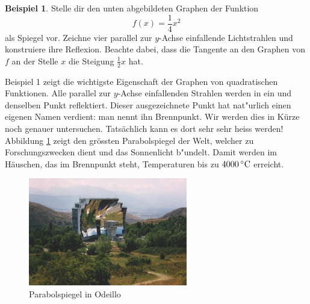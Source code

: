 \documentclass[%
<<<<<<< Updated upstream
11pt,%
twoside,%
titlepage,%
german,%
=======
11pt,%
twoside,%
titlepage,%
swissgerman,%
>>>>>>> Stashed changes
headsepline%
]{scrartcl}
\newcommand{\definition}[1]{\colorbox{emerald}{#1}}
\theoremstyle{definition}
\newtheorem{bsp}{Beispiel}[subsection] %
\theoremstyle{plain}
\newcounter{theo}[section]\setcounter{theo}{0}
\newcommand{\definition}[1]{\colorbox{emerald}{#1}}
\begin{document}
\begin{bsp}
Stelle dir den unten abgebildeten Graphen der Funktion
$$f(x) = \frac{1}{4}x^2$$
als Spiegel vor. Zeichne vier parallel zur $y$-Achse einfallende Lichtstrahlen und konstruiere ihre Reflexion. Beachte dabei, dass die Tangente an den Graphen von $f$ an der Stelle $x$ die Steigung $\frac{1}{2}x$ hat.
\begin{figure}
\begin{center}
\end{center}
\end{figure}
\end{bsp}
Beispiel 1 zeigt die wichtigste Eigenschaft der Graphen von quadratischen Funktionen. Alle parallel zur $y$-Achse einfallenden Strahlen werden in ein und denselben Punkt reflektiert. Dieser ausgezeichnete Punkt hat nat"urlich einen eigenen Namen verdient: man nennt ihn
\definition{Brennpunkt}. Wir werden dies in K\"urze noch genauer untersuchen.
Tats\"achlich kann es dort sehr sehr heiss werden! Abbildung \ref{odiello} zeigt den gr\"ossten Parabolspiegel der Welt, welcher zu Forschungszwecken dient und das Sonnenlicht \glqq b"undelt\grqq. Damit werden im H\"auschen, das im Brennpunkt steht, Temperaturen bis zu $\unit[4000]{ ^\circ C}$ erreicht.

\begin{figure}
\begin{center}
\includegraphics[width=0.618\textwidth]{pictures/odeillo}
\end{center}
\caption{Parabolspiegel in Odeillo}\label{odiello} 
\end{figure}
\end{document}
